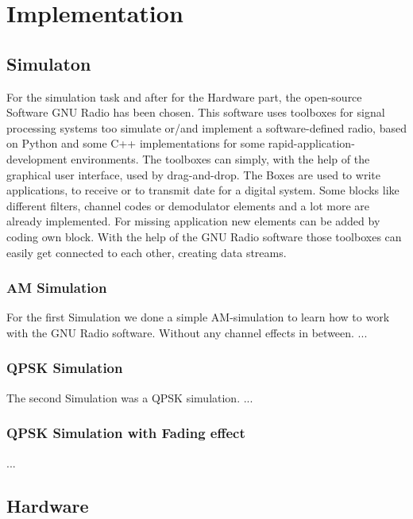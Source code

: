 
\chapter{Implementation}

\section{Simulaton}

For the simulation task and after for the Hardware part, the open-source Software GNU Radio has been chosen. This software uses toolboxes for signal processing systems too simulate or/and implement a software-defined radio, based on Python and some C++ implementations for some rapid-application-development environments. The toolboxes can simply, with the help of the graphical user interface, used by drag-and-drop. The Boxes are used to write applications, to receive or to transmit date for a digital system. Some blocks like different filters, channel codes or demodulator elements and a lot more are already implemented. For missing application new elements can be added by coding own block. With the help of the GNU Radio software those toolboxes can easily get connected to each other, creating data streams. 

\subsection{AM Simulation}

For the first Simulation we done a simple AM-simulation to learn how to work with the GNU Radio software. Without any channel effects in between. ...


\subsection{QPSK Simulation}

The second Simulation was a QPSK simulation. 
...


\subsection{QPSK Simulation with Fading effect}
...


\section{Hardware}

